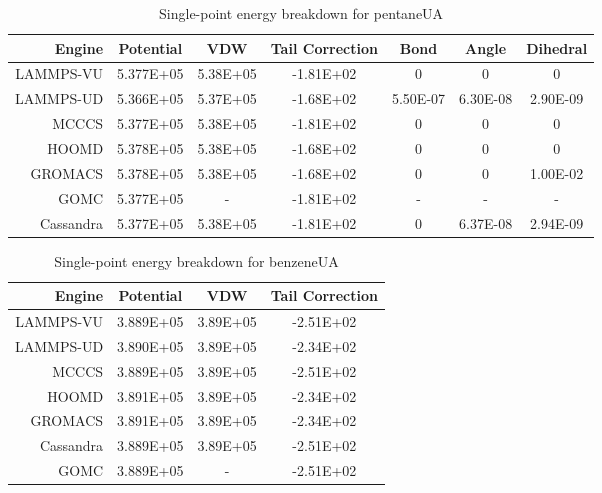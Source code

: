 \begin{landscape}
\begin{table}[h!]
\caption{Single-point energy breakdown for pentaneUA}\label{tab:sp_pentane}
\centering
\begin{tabular}{rcccccc}
\hline
Engine & Potential & VDW & Tail Correction & Bond & Angle & Dihedral \\ \hline
LAMMPS-VU & 5.377E+05 & 5.38E+05 & -1.81E+02 & 0 & 0 & 0 \\
LAMMPS-UD & 5.366E+05 & 5.37E+05 & -1.68E+02 & 5.50E-07 & 6.30E-08 & 2.90E-09 \\
MCCCS & 5.377E+05 & 5.38E+05 & -1.81E+02 & 0 & 0 & 0 \\
HOOMD & 5.378E+05 & 5.38E+05 & -1.68E+02 & 0 & 0 & 0 \\
GROMACS & 5.378E+05 & 5.38E+05 & -1.68E+02 & 0 & 0 & 1.00E-02 \\
GOMC & 5.377E+05 & - & -1.81E+02 & - & - & - \\
Cassandra & 5.377E+05 & 5.38E+05 & -1.81E+02 & 0 & 6.37E-08 & 2.94E-09 \\ \hline
\end{tabular}
\end{table}

\begin{table}[h!]
\caption{Single-point energy breakdown for benzeneUA}\label{tab:sp_benzene}
\centering
\begin{tabular}{rccc}
\hline
Engine & Potential & VDW & Tail Correction \\ \hline
LAMMPS-VU & 3.889E+05 & 3.89E+05 & -2.51E+02 \\
LAMMPS-UD & 3.890E+05 & 3.89E+05 & -2.34E+02 \\
MCCCS & 3.889E+05 & 3.89E+05 & -2.51E+02 \\
HOOMD & 3.891E+05 & 3.89E+05 & -2.34E+02 \\
GROMACS & 3.891E+05 & 3.89E+05 & -2.34E+02 \\
Cassandra & 3.889E+05 & 3.89E+05 & -2.51E+02 \\
GOMC & 3.889E+05 & - & -2.51E+02 \\ \hline
\end{tabular}
\end{table}



\end{landscape}
